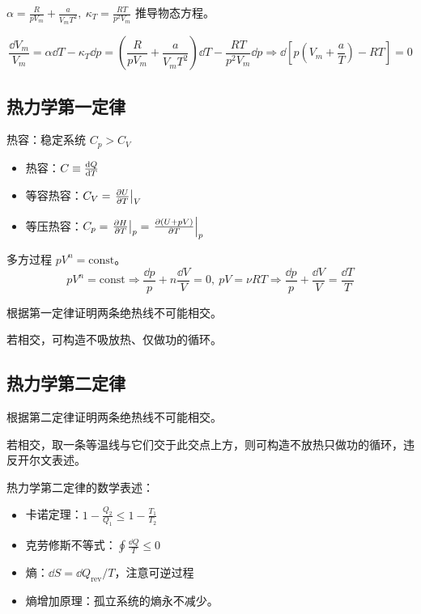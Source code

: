 \begin{framed}
$\alpha = \frac{R}{p V_m} + \frac{a}{V_m T^2},\ \kappa_T = \frac{R T}{p^2 V_m}$ 推导物态方程。

\[
\frac{\dd{V_m}}{V_m} = \alpha \dd{T} - \kappa_T \dd{p} = (\frac{R}{p V_m} + \frac{a}{V_m T^2}) \dd{T} - \frac{R T}{p^2 V_m} \dd{p} \Rightarrow \dd{\left[p \left(V_m + \frac{a}{T}\right) - R T\right]} = 0
\]
\end{framed}

\subsection{热力学第一定律}

热容：稳定系统 $C_p > C_V$

\begin{itemize}
    \item 热容：$C \equiv \dv{Q}{T}$
    \item 等容热容：$C_V = \left.\pdv{U}{T}\right|_V$
    \item 等压热容：$C_p = \left.\pdv{H}{T}\right|_p = \left.\pdv{(U + pV)}{T}\right|_p$
\end{itemize}

\begin{framed}
多方过程 $p V^n = \text{const}$。
\[
p V^n = \text{const} \Rightarrow \frac{\dd{p}}{p} + n \frac{\dd{V}}{V} = 0,\ p V = \nu R T \Rightarrow \frac{\dd{p}}{p} + \frac{\dd{V}}{V} = \frac{\dd{T}}{T}
\]
\end{framed}

\begin{framed}
根据第一定律证明两条绝热线不可能相交。

若相交，可构造不吸放热、仅做功的循环。
\end{framed}

\subsection{热力学第二定律}

\begin{framed}
根据第二定律证明两条绝热线不可能相交。

若相交，取一条等温线与它们交于此交点上方，则可构造不放热只做功的循环，违反开尔文表述。
\end{framed}

热力学第二定律的数学表述：
\begin{itemize}
    \item 卡诺定理：$1 - \frac{Q_2}{Q_1} \leq 1 - \frac{T_1}{T_2}$
    \item 克劳修斯不等式：$\oint \frac{\dd{Q}}{T} \leq 0$
    \item 熵：$\dd{S} = \dd{Q_{\text{rev}}} / T$，注意可逆过程
    \item 熵增加原理：孤立系统的熵永不减少。
\end{itemize}


